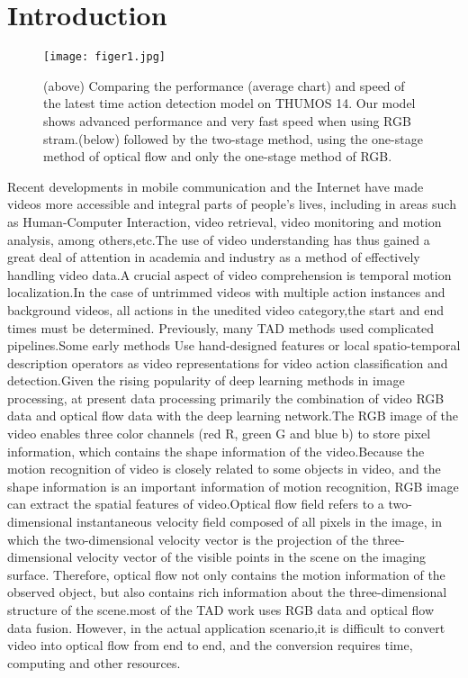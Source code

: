\documentclass[10pt,twocolumn,letterpaper]{article}
\begin{document}
\section{Introduction}
\label{sec:intro}
\begin{figure}[!]
 \centering
\texttt{[image: figer1.jpg]}
 \caption{(above) Comparing the performance (average chart) and speed of the latest time action detection model on THUMOS 14. Our model shows advanced performance and very fast speed when using RGB stram.(below) followed by the two-stage method, using the one-stage method of optical flow and only the one-stage method of RGB.}
   \label{fig1}
\end{figure}
Recent developments in mobile communication and the Internet have made videos more accessible and integral parts of people's lives, including in areas such as Human-Computer Interaction, video retrieval, video monitoring and motion analysis, among others,etc.The use of video understanding has thus gained a great deal of attention in academia and industry as a method of effectively handling video data.A crucial aspect of video comprehension is temporal motion localization.In the case of untrimmed videos with multiple action instances and background videos, all actions in the unedited video category,the start and end times must be determined.
Previously, many TAD methods used complicated pipelines.Some early methods Use hand-designed features or local spatio-temporal description operators as video representations for video action classification and detection.Given the rising popularity of deep learning methods in image processing, at present data processing primarily the combination of video RGB data and optical flow data with the deep learning network.The RGB image of the video enables three color channels (red R, green G and blue b) to store pixel information, which contains the shape information of the video.Because the motion recognition of video is closely related to some objects in video, and the shape information is an important information of motion recognition, RGB image can extract the spatial features of video.Optical flow field refers to a two-dimensional instantaneous velocity field composed of all pixels in the image, in which the two-dimensional velocity vector is the projection of the three-dimensional velocity vector of the visible points in the scene on the imaging surface. Therefore, optical flow not only contains the motion information of the observed object, but also contains rich information about the three-dimensional structure of the scene.most of the TAD work uses RGB data and optical flow data fusion. However, in the actual application scenario,it is difficult to convert video into optical flow from end to end, and the conversion requires time, computing and other resources.
\end{document}
